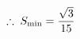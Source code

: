 \documentclass[preview]{standalone}
\begin{document}
\begin{align*}
\special{dvisvgm:raw <g id='unique000'>}\therefore\; S_{\min}=\frac{\sqrt{3}}{15}\special{dvisvgm:raw </g>}
\end{align*}
\end{document}
